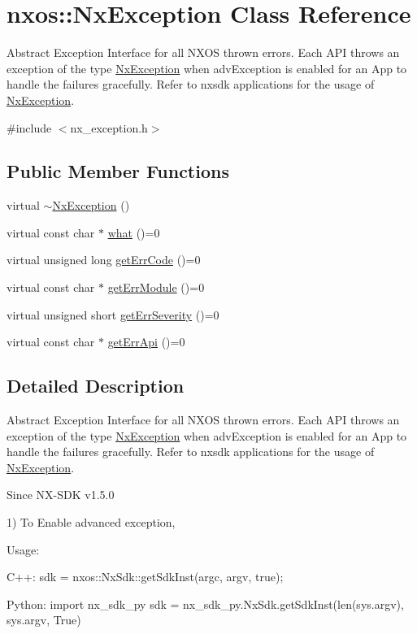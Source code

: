 \hypertarget{classnxos_1_1NxException}{
\section{nxos::NxException Class Reference}
\label{classnxos_1_1NxException}
}


Abstract Exception Interface for all NXOS thrown errors. Each API throws an exception of the type \hyperlink{classnxos_1_1NxException}{NxException} when advException is enabled for an App to handle the failures gracefully. Refer to nxsdk applications for the usage of \hyperlink{classnxos_1_1NxException}{NxException}.  


{\ttfamily \#include $<$nx\_\-exception.h$>$}\subsection*{Public Member Functions}
\begin{DoxyCompactItemize}
\item 
virtual \hyperlink{classnxos_1_1NxException_a2063f2937b4fdfe7a2e58f0ce727d70c}{$\sim$NxException} ()
\item 
virtual const char $\ast$ \hyperlink{classnxos_1_1NxException_ad475b90fb193848245b9537524439943}{what} ()=0
\item 
virtual unsigned long \hyperlink{classnxos_1_1NxException_ace42c480c5b1efc0779028339a09f067}{getErrCode} ()=0
\item 
virtual const char $\ast$ \hyperlink{classnxos_1_1NxException_ad428a765217581f320af95386350ef30}{getErrModule} ()=0
\item 
virtual unsigned short \hyperlink{classnxos_1_1NxException_a7b5ffd11c04e3955d874ea7a6b18063f}{getErrSeverity} ()=0
\item 
virtual const char $\ast$ \hyperlink{classnxos_1_1NxException_a82ce0a75c61b55ca191c86e5abfeaa20}{getErrApi} ()=0
\end{DoxyCompactItemize}


\subsection{Detailed Description}
Abstract Exception Interface for all NXOS thrown errors. Each API throws an exception of the type \hyperlink{classnxos_1_1NxException}{NxException} when advException is enabled for an App to handle the failures gracefully. Refer to nxsdk applications for the usage of \hyperlink{classnxos_1_1NxException}{NxException}. \begin{DoxySince}{Since}
NX-\/SDK v1.5.0
\end{DoxySince}
1) To Enable advanced exception, 
\begin{DoxyCode}
  Usage:

  C++:
     sdk = nxos::NxSdk::getSdkInst(argc, argv, true);

  Python:
     import nx_sdk_py
     sdk = nx_sdk_py.NxSdk.getSdkInst(len(sys.argv), sys.argv, True)
\end{DoxyCode}


